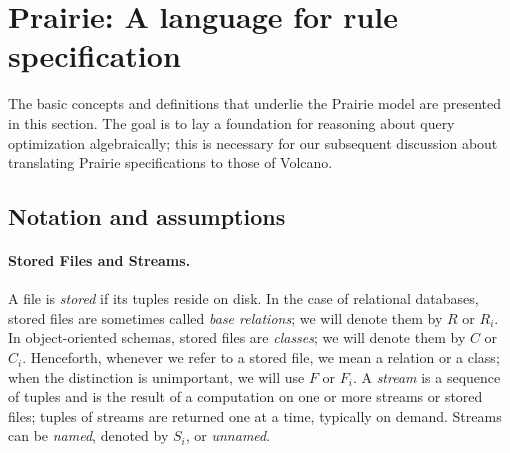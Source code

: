 \section{Prairie: A language for rule specification}
\label{sec:framework}

The basic concepts and definitions that underlie the Prairie model are
presented in this section.  The goal is to lay a foundation for
reasoning about query optimization algebraically; this is necessary for
our subsequent discussion about translating Prairie specifications to
those of Volcano.

\subsection {Notation and assumptions}
\label{sec:notation}

\paragraph{Stored Files and Streams.}
A file is \emph{stored} if its tuples reside on disk.  In the case of
relational databases, stored files are sometimes called \emph{base
relations}; we will denote them by $R$ or $R_i$.  In object-oriented
schemas, stored files are \emph{classes}; we will denote them by
$\textit{C}$ or $\textit{C}_i$.  Henceforth, whenever we refer to a
stored file, we mean a relation or a class; when the distinction is
unimportant, we will use $F$ or $F_i$.  A \emph{stream} is a sequence
of tuples and is the result of a computation on one or more streams or
stored files; tuples of streams are returned one at a time, typically
on demand.  Streams can be \emph{named}, denoted by $S_i$, or
\emph{unnamed}.

